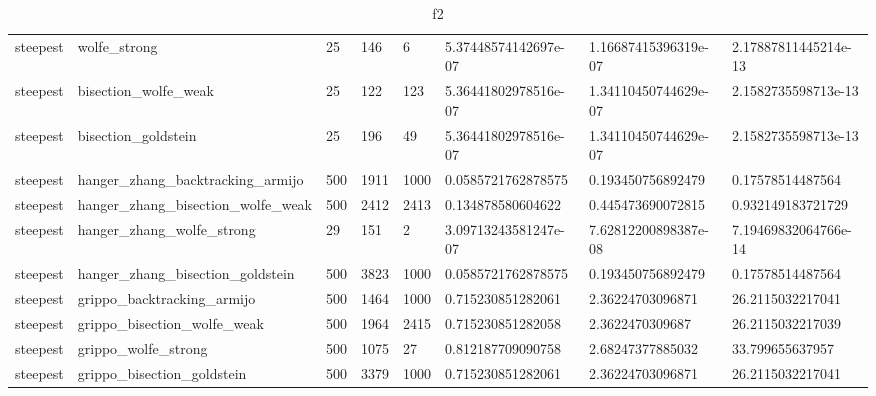 \documentclass[a4paper,11pt]{article}
\numberwithin{equation}{section} %
\begin{document}
\begin{table}[h!]
{\begin{tabular}{|l|l|l|l|l|l|l|l|}
        steepest & wolfe\_strong & 25 & 146 & 6 & 5.37448574142697e-07 & 1.16687415396319e-07 & 2.17887811445214e-13 \\
        steepest & bisection\_wolfe\_weak & 25 & 122 & 123 & 5.36441802978516e-07 & 1.34110450744629e-07 & 2.1582735598713e-13 \\
        steepest & bisection\_goldstein & 25 & 196 & 49 & 5.36441802978516e-07 & 1.34110450744629e-07 & 2.1582735598713e-13 \\
        steepest & hanger\_zhang\_backtracking\_armijo & 500 & 1911 & 1000 & 0.0585721762878575 & 0.193450756892479 & 0.17578514487564 \\
        steepest & hanger\_zhang\_bisection\_wolfe\_weak & 500 & 2412 & 2413 & 0.134878580604622 & 0.445473690072815 & 0.932149183721729 \\
        steepest & hanger\_zhang\_wolfe\_strong & 29 & 151 & 2 & 3.09713243581247e-07 & 7.62812200898387e-08 & 7.19469832064766e-14 \\
        steepest & hanger\_zhang\_bisection\_goldstein & 500 & 3823 & 1000 & 0.0585721762878575 & 0.193450756892479 & 0.17578514487564 \\
        steepest & grippo\_backtracking\_armijo & 500 & 1464 & 1000 & 0.715230851282061 & 2.36224703096871 & 26.2115032217041 \\
        steepest & grippo\_bisection\_wolfe\_weak & 500 & 1964 & 2415 & 0.715230851282058 & 2.3622470309687 & 26.2115032217039 \\
        steepest & grippo\_wolfe\_strong & 500 & 1075 & 27 & 0.812187709090758 & 2.68247377885032 & 33.799655637957 \\
        steepest & grippo\_bisection\_goldstein & 500 & 3379 & 1000 & 0.715230851282061 & 2.36224703096871 & 26.2115032217041 \\


\end{tabular}}
\caption{f2}
\label{table:f2}
\end{table}
\end{document}
